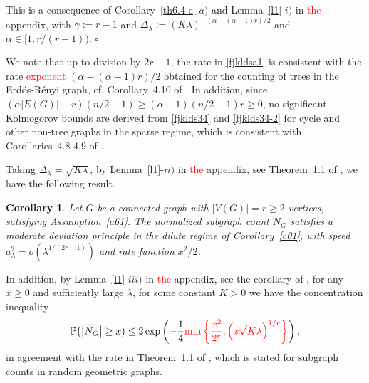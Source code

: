 \documentclass[12pt]{article}
\newtheorem{corollary}[prop]{Corollary}
\def\P{\mathbb{P}}
\newenvironment{Proof}{\removelastskip\par\medskip
\noindent{\em Proof.} \rm}{\penalty-20\null\hfill$\square$\par\medbreak}
\numberwithin{equation}{section}
\begin{document}
\begin{Proof}
  This is a consequence of 
  Corollary~\ref{th6.4-c}-$a)$
  and Lemma~\ref{l1}-$i)$ in \textcolor{red}{the} appendix,
  with $\gamma :=r-1$ and 
  $\Delta_\lambda:=
  (K \lambda )^{ - (
 \alpha   -(\alpha - 1)r 
    )/2}$
  and $\alpha \in [1, r/(r-1) )$. 
\end{Proof} 
  We note that  up to division by $2r - 1$,
   the rate in \eqref{fjkldsa1} is consistent  
 with the rate \textcolor{red}{exponent} $(
 \alpha    -(\alpha - 1)r 
     ) / 2$ obtained for the counting of trees in the
 Erd{\H o}s-R\'enyi graph, cf. Corollary~4.10 of \cite{PS2}. 
 In addition, since 
$
(\alpha |E(G)|-r)(n/2-1)
\geq
(\alpha -1)(n/2-1)r \geq 0$,
no significant Kolmogorov bounds
are derived from \eqref{fjklds34}
and \eqref{fjklds34-2} 
for cycle and other non-tree graphs 
in the sparse regime,
which is consistent with
Corollaries~4.8-4.9 of \cite{PS2}. 

\medskip

 Taking $\Delta_\lambda = \sqrt{K \lambda}$, 
 by Lemma~\ref{l1}-$ii)$ in \textcolor{red}{the} appendix, see Theorem~1.1 of \cite{doring},
we have the following result. 
\begin{corollary} %
  \label{c01-2-0}
  Let $G$ be a connected graph with $|V(G)| = r \geq 2$ vertices,
  satisfying Assumption~\ref{a61}. 
  The normalized subgraph count $\widetilde{N}_G$
    satisfies a moderate deviation principle
  in the dilute regime of Corollary~\ref{c01}, 
  with speed $a_\lambda^2 = o( \lambda^{1/(2r - 1)} )$ and rate function $x^2/2$.
\end{corollary}
In addition,
by Lemma~\ref{l1}-$iii)$ in \textcolor{red}{the} appendix,
see the corollary of \cite[Lemma~2.4]{saulis},
for any $x\ge0$ and sufficiently large $\lambda$,
for some constant $K>0$ 
we have the concentration inequality 
\begin{equation}
\label{concentrationineq}
  \P \big( \big| \widetilde{N}_G \big|
  \geq x)\le2\exp\left(-
  \frac{1}{4} \textcolor{red}{\min\left\{\frac{x^2}{2^r},
   \left( x\sqrt{K \lambda}\right)^{1/r}\right\}
  }
   \right), 
\end{equation} 
in agreement with the rate in Theorem~1.1 of \cite{bachmann},
which is stated for subgraph counts in random geometric
graphs. 
\end{document}
